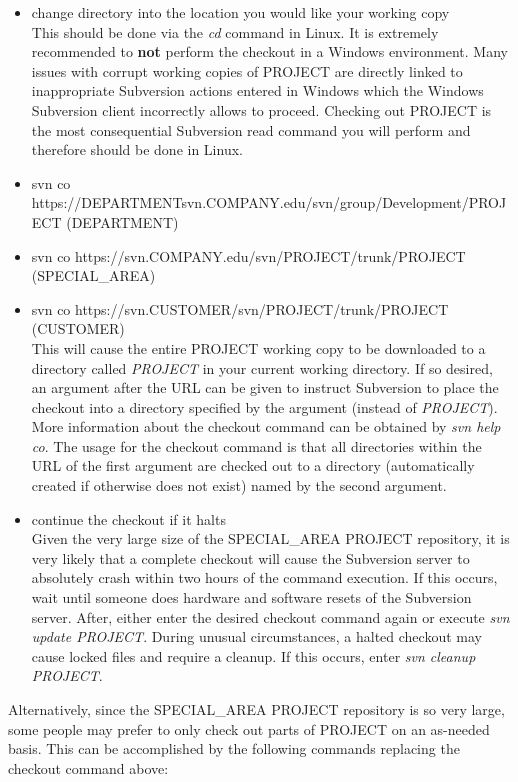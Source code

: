 \documentclass[12pt,letterpaper]{article}
\begin{document}
\begin{itemize}
\item change directory into the location you would like your working copy\\
This should be done via the \emph{cd} command in Linux.  It is extremely recommended to \textbf{not} perform the checkout in a Windows environment.  Many issues with corrupt working copies of PROJECT are directly linked to inappropriate Subversion actions entered in Windows which the Windows Subversion client incorrectly allows to proceed.  Checking out PROJECT is the most consequential Subversion read command you will perform and therefore should be done in Linux.
\item svn co https://DEPARTMENTsvn.COMPANY.edu/svn/group/Development/PROJECT (DEPARTMENT)
\item svn co https://svn.COMPANY.edu/svn/PROJECT/trunk/PROJECT (SPECIAL_AREA)
\item svn co https://svn.CUSTOMER/svn/PROJECT/trunk/PROJECT (CUSTOMER)\\
This will cause the entire PROJECT working copy to be downloaded to a directory called \emph{PROJECT} in your current working directory.  If so desired, an argument after the URL can be given to instruct Subversion to place the checkout into a directory specified by the argument (instead of \emph{PROJECT}).  More information about the checkout command can be obtained by \emph{svn help co}.  The usage for the checkout command is that all directories within the URL of the first argument are checked out to a directory (automatically created if otherwise does not exist) named by the second argument.
\item continue the checkout if it halts\\
Given the very large size of the SPECIAL_AREA PROJECT repository, it is very likely that a complete checkout will cause the Subversion server to absolutely crash within two hours of the command execution.  If this occurs, wait until someone does hardware and software resets of the Subversion server.  After, either enter the desired checkout command again or execute \emph{svn update PROJECT}.  During unusual circumstances, a halted checkout may cause locked files and require a cleanup.  If this occurs, enter \emph{svn cleanup PROJECT}.
\end{itemize}

Alternatively, since the SPECIAL_AREA PROJECT repository is so very large, some people may prefer to only check out parts of PROJECT on an as-needed basis.  This can be accomplished by the following commands replacing the checkout command above:
\end{document}
